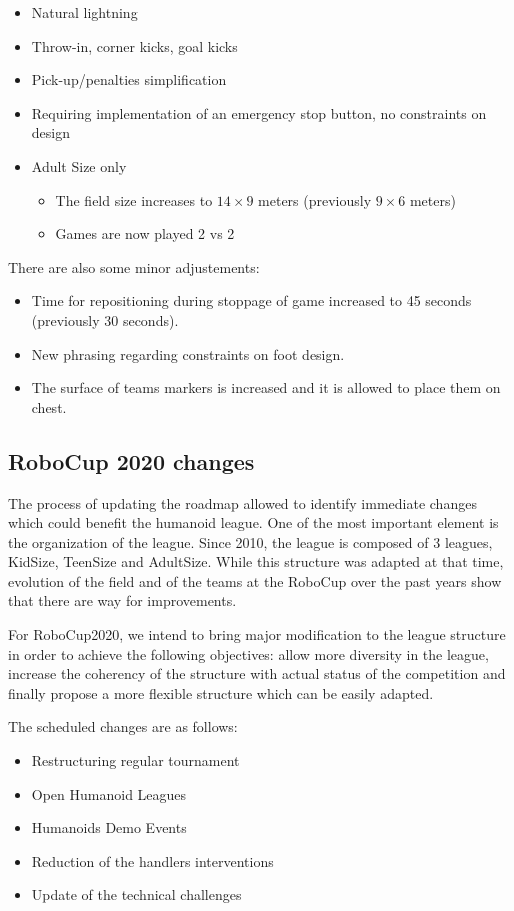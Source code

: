 \documentclass{article}
\begin{document}
\begin{itemize}
\item Natural lightning
\item Throw-in, corner kicks, goal kicks %
\item Pick-up/penalties simplification
\item Requiring implementation of an emergency stop button, no constraints on design
\item Adult Size only
  \begin{itemize}
  \item The field size increases to $14 \times 9$ meters (previously $9 \times 6$ meters)
  \item Games are now played 2 vs 2
  \end{itemize}
\end{itemize}

There are also some minor adjustements:

\begin{itemize}
\item Time for repositioning during stoppage of game increased to 45 seconds (previously 30 seconds).
\item New phrasing regarding constraints on foot design.
\item The surface of teams markers is increased and it is allowed to place them on chest.
\end{itemize}

\subsection{RoboCup 2020 changes}

The process of updating the roadmap allowed to identify immediate changes which
could benefit the humanoid league.
One of the most important element is the organization of the league. Since 2010,
the league is composed of 3 leagues, KidSize, TeenSize and AdultSize.
While this structure was adapted at that time, evolution of the field and of the
teams at the RoboCup over the past years show that there are way for improvements.

For RoboCup2020, we intend to bring major modification to the league structure
in order to achieve the following objectives:
allow more diversity in the league,
increase the coherency of the structure with actual status of the competition
and finally propose a more flexible structure which can be easily adapted.

The scheduled changes are as follows:
\begin{itemize}
\item Restructuring regular tournament
\item Open Humanoid Leagues
\item Humanoids Demo Events
\item Reduction of the handlers interventions
\item Update of the technical challenges
\end{itemize}
\end{document}
